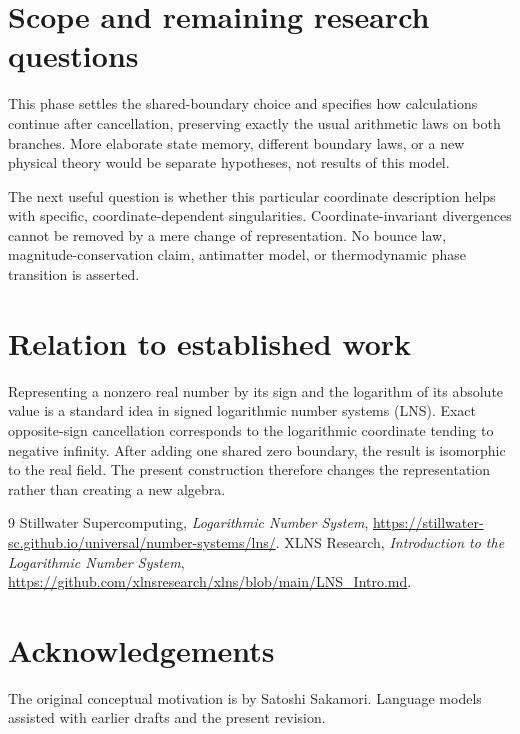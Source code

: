 \documentclass[11pt,a4paper]{article}
\begin{document}
\section{Scope and remaining research questions}

This phase settles the shared-boundary choice and specifies how
calculations continue after cancellation, preserving exactly the
usual arithmetic laws on both branches. More elaborate state
memory, different boundary laws, or a new physical theory would
be separate hypotheses, not results of this model.

The next useful question is whether this particular coordinate
description helps with specific, coordinate-dependent
singularities. Coordinate-invariant divergences cannot be
removed by a mere change of representation. No bounce law,
magnitude-conservation claim, antimatter model, or
thermodynamic phase transition is asserted.

\section{Relation to established work}

Representing a nonzero real number by its sign and the logarithm
of its absolute value is a standard idea in signed logarithmic
number systems (LNS). Exact opposite-sign cancellation corresponds
to the logarithmic coordinate tending to negative infinity. After adding one shared zero boundary, the result is isomorphic
to the real field. The present construction therefore changes the
representation rather than creating a new algebra.

\begin{thebibliography}{9}
Stillwater Supercomputing, \emph{Logarithmic Number System},
\url{https://stillwater-sc.github.io/universal/number-systems/lns/}.
XLNS Research, \emph{Introduction to the Logarithmic Number System},
\url{https://github.com/xlnsresearch/xlns/blob/main/LNS_Intro.md}.
\end{thebibliography}

\section*{Acknowledgements}
The original conceptual motivation is by Satoshi Sakamori.
Language models assisted with earlier drafts and the present revision.
\end{document}
